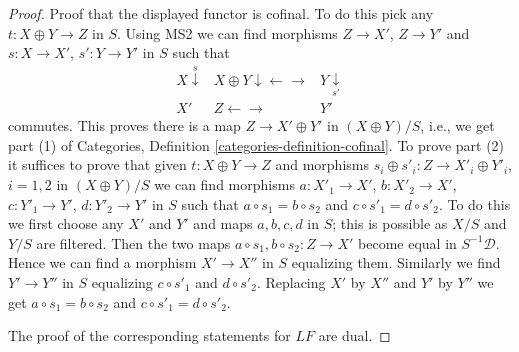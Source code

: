 \begin{proof}
\medskip\noindent
Proof that the displayed functor is cofinal.
To do this pick any $t : X \oplus Y \to Z$ in $S$.
Using MS2 we can find morphisms $Z \to X'$, $Z \to Y'$
and $s : X \to X'$, $s' : Y \to Y'$ in $S$ such that
$$
\begin{array}{ccc}X \overset{s}{\downarrow} & X \oplus Y \downarrow\longleftarrow\longrightarrow & Y \underset{s'}{\downarrow} \\ X' & Z \longleftarrow\longrightarrow & Y'\end{array}
$$
commutes. This proves there is a map $Z \to X' \oplus Y'$ in
$(X \oplus Y)/S$, i.e., we get part (1) of Categories, Definition
\ref{categories-definition-cofinal}. To prove part (2) it suffices
to prove that given $t : X \oplus Y \to Z$ and morphisms
$s_i \oplus s'_i : Z \to X'_i \oplus Y'_i$, $i = 1, 2$ in $(X \oplus Y)/S$
we can find morphisms $a : X'_1 \to X'$, $b : X'_2 \to X'$,
$c : Y'_1 \to Y'$, $d : Y'_2 \to Y'$ in $S$ such that
$a \circ s_1 = b \circ s_2$ and $c \circ s'_1 = d \circ s'_2$.
To do this we first choose any $X'$ and $Y'$ and maps $a, b, c, d$
in $S$; this is possible as $X/S$ and $Y/S$ are filtered. Then the
two maps $a \circ s_1, b \circ s_2 : Z \to X'$ become equal in
$S^{-1}\mathcal{D}$. Hence we can find a morphism
$X' \to X''$ in $S$ equalizing them. Similarly we find $Y' \to Y''$ in $S$
equalizing $c \circ s'_1$ and $d \circ s'_2$. Replacing $X'$ by $X''$ and
$Y'$ by $Y''$ we get $a \circ s_1 = b \circ s_2$ and
$c \circ s'_1 = d \circ s'_2$.

\medskip\noindent
The proof of the corresponding statements for $LF$ are dual.
\end{proof}

